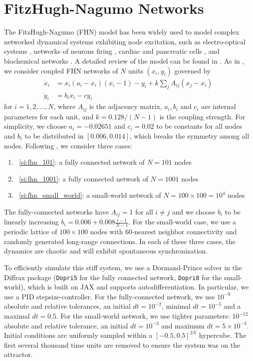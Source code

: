 \documentclass[twocolumn,10pt]{article}
\begin{document}
\section{FitzHugh-Nagumo Networks}
\label{si:fhn}
The FitzHugh-Nagumo (FHN) model has been widely used to model complex networked dynamical systems exhibiting node excitation, such as electro-optical systems \cite{romeira2016regenerative}, networks of neurons firing \cite{gerster2020fitzhugh}, cardiac \cite{nash2004electromechanical} and pancreatic cells \cite{scialla2021hubs}, and biochemical networks \cite{lin2004resonance}. A detailed review of the model can be found in \cite{cebrian2024six}. 
%
As in \cite{ansmann2013a, karnatak2014a}, we consider coupled FHN networks of $N$ units $(x_i, y_i)$ governed by
%
\begingroup
\addtolength{\jot}{-10pt}
\begin{align} \nonumber 
\dot x_i & = x_i (a_i - x_i)(x_i - 1) - y_i + k \sum_j A_{ij}(x_j - x_i)\\  
\dot y_i & = b_i x_i - c y_i
\end{align}
\endgroup
%
\noindent for $i = 1,2, \dots,  N$, where $A_{ij}$ is the adjacency matrix, $a_i, b_i$ and $c_i$ are internal parameters for each unit, and $k = 0.128/(N-1)$ is the coupling strength. For simplicity, we choose $a_i=-0.02651$ and $c_i = 0.02$ to be constants for all nodes and $b_i$ to be distributed in $[0.006, 0.014]$, which breaks the symmetry among all nodes. 
Following \cite{ansmann2013a, karnatak2014a}, we consider three cases: 
\begin{enumerate}
    \item ~\ref{si:fhn_101}: a fully connected network of $N=101$ nodes
    \item ~\ref{si:fhn_1001}: a fully connected network of $N=1001$ nodes
    \item ~\ref{si:fhn_small_world}: a small-world network of $N=100 \times 100 = 10^4$ nodes
\end{enumerate}

\noindent The fully-connected networks have $A_{ij} = 1$ for all $i \neq j$ and we choose $b_i$ to be linearly increasing $b_i = 0.006 + 0.008\frac{i-1}{N-1}$. For the small-world case, we use a periodic lattice of $100\times100$ nodes with $60$-nearest neighbor connectivity and randomly generated long-range connections. In each of these three cases, the dynamics are chaotic and will exhibit spontaneous synchronization. 

To efficiently simulate this stiff system, we use a Dormand-Prince solver in the Diffrax package \cite{kidger2021on} (\verb|Dopri5| for the fully connected network, \verb|Dopri8| for the small-world), which is built on JAX and supports autodifferentiation. In particular, we use a PID stepsize-controller. For the fully-connected network, we use $10^{-9}$ absolute and relative tolerances, an initial $dt=10^{-2}$, minimal $dt=10^{-5}$ and a maximal $dt=0.5$. For the small-world network, we use tighter parameters: $10^{-12}$ absolute and relative tolerance, an initial $dt=10^{-3}$ and maximum $dt=5\times 10^{-3}$. Initial conditions are uniformly sampled within a $[-0.5,0.5]^{2N}$ hypercube. The first several thousand time units are removed to ensure the system was on the attractor. 
\end{document}

